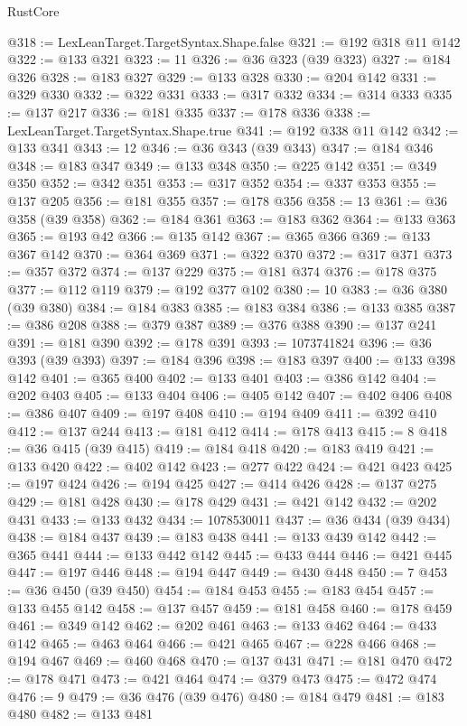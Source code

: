 \begin{lexlean}{RustCore}
\begin{coremodule}
@318 := LexLeanTarget.TargetSyntax.Shape.false
@321 := @192 @318 @11 @142
@322 := @133 @321
@323 := 11
@326 := @36 @323 (@39 @323)
@327 := @184 @326
@328 := @183 @327
@329 := @133 @328
@330 := @204 @142
@331 := @329 @330
@332 := @322 @331
@333 := @317 @332
@334 := @314 @333
@335 := @137 @217
@336 := @181 @335
@337 := @178 @336
@338 := LexLeanTarget.TargetSyntax.Shape.true
@341 := @192 @338 @11 @142
@342 := @133 @341
@343 := 12
@346 := @36 @343 (@39 @343)
@347 := @184 @346
@348 := @183 @347
@349 := @133 @348
@350 := @225 @142
@351 := @349 @350
@352 := @342 @351
@353 := @317 @352
@354 := @337 @353
@355 := @137 @205
@356 := @181 @355
@357 := @178 @356
@358 := 13
@361 := @36 @358 (@39 @358)
@362 := @184 @361
@363 := @183 @362
@364 := @133 @363
@365 := @193 @42
@366 := @135 @142
@367 := @365 @366
@369 := @133 @367 @142
@370 := @364 @369
@371 := @322 @370
@372 := @317 @371
@373 := @357 @372
@374 := @137 @229
@375 := @181 @374
@376 := @178 @375
@377 := @112 @119
@379 := @192 @377 @102
@380 := 10
@383 := @36 @380 (@39 @380)
@384 := @184 @383
@385 := @183 @384
@386 := @133 @385
@387 := @386 @208
@388 := @379 @387
@389 := @376 @388
@390 := @137 @241
@391 := @181 @390
@392 := @178 @391
@393 := 1073741824
@396 := @36 @393 (@39 @393)
@397 := @184 @396
@398 := @183 @397
@400 := @133 @398 @142
@401 := @365 @400
@402 := @133 @401
@403 := @386 @142
@404 := @202 @403
@405 := @133 @404
@406 := @405 @142
@407 := @402 @406
@408 := @386 @407
@409 := @197 @408
@410 := @194 @409
@411 := @392 @410
@412 := @137 @244
@413 := @181 @412
@414 := @178 @413
@415 := 8
@418 := @36 @415 (@39 @415)
@419 := @184 @418
@420 := @183 @419
@421 := @133 @420
@422 := @402 @142
@423 := @277 @422
@424 := @421 @423
@425 := @197 @424
@426 := @194 @425
@427 := @414 @426
@428 := @137 @275
@429 := @181 @428
@430 := @178 @429
@431 := @421 @142
@432 := @202 @431
@433 := @133 @432
@434 := 1078530011
@437 := @36 @434 (@39 @434)
@438 := @184 @437
@439 := @183 @438
@441 := @133 @439 @142
@442 := @365 @441
@444 := @133 @442 @142
@445 := @433 @444
@446 := @421 @445
@447 := @197 @446
@448 := @194 @447
@449 := @430 @448
@450 := 7
@453 := @36 @450 (@39 @450)
@454 := @184 @453
@455 := @183 @454
@457 := @133 @455 @142
@458 := @137 @457
@459 := @181 @458
@460 := @178 @459
@461 := @349 @142
@462 := @202 @461
@463 := @133 @462
@464 := @433 @142
@465 := @463 @464
@466 := @421 @465
@467 := @228 @466
@468 := @194 @467
@469 := @460 @468
@470 := @137 @431
@471 := @181 @470
@472 := @178 @471
@473 := @421 @464
@474 := @379 @473
@475 := @472 @474
@476 := 9
@479 := @36 @476 (@39 @476)
@480 := @184 @479
@481 := @183 @480
@482 := @133 @481

\end{coremodule}
\end{lexlean}
